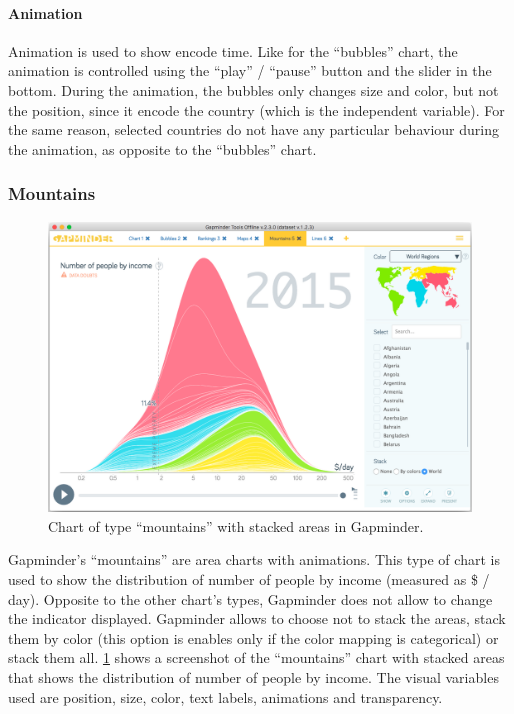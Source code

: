 \paragraph{Animation}
Animation is used to show encode time.
Like for the ``bubbles'' chart, the animation is controlled using the ``play'' / ``pause'' button and the slider in the bottom.
During the animation, the bubbles only changes size and color, but not the position, since it encode the country (which is the independent variable).
For the same reason, selected countries do not have any particular behaviour during the animation, as opposite to the ``bubbles'' chart.


\subsubsection{Mountains}
\begin{figure}[h]
	\centering
	\includegraphics[width=0.95\columnwidth]{figures/mountains}
	\caption{Chart of type ``mountains'' with stacked areas in Gapminder.}
	\label{fig:mountains}
\end{figure}

Gapminder's ``mountains'' are area charts with animations.
This type of chart is used to show the distribution of number of people by income (measured as \$ / day).
Opposite to the other chart's types, Gapminder does not allow to change the indicator displayed.
Gapminder allows to choose not to stack the areas, stack them by color (this option is enables only if the color mapping is categorical) or stack them all.
\cref{fig:mountains} shows a screenshot of the ``mountains'' chart with stacked areas that shows the distribution of number of people by income.
The visual variables used are position, size, color, text labels, animations and transparency.

